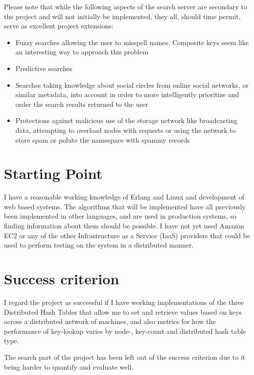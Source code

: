 Please note that while the following aspects of the search server are secondary to the project and will not initially be implemented, they all, should time permit, serve as excellent project extensions:

\begin{itemize}
  \item Fuzzy searches allowing the user to misspell names. Composite keys seem like an interesting way to approach this problem
  \item Predictive searches
  \item Searches taking knowledge about social circles from online social networks, or similar metadata, into account in order to more intelligently prioritize and order the search results returned to the user
  \item Protections against malicious use of the storage network like broadcasting data, attempting to overload nodes with requests or using the network to store spam or polute the namespace with spammy records
\end{itemize}


\section*{Starting Point}

I have a reasonable working knowledge of Erlang and Linux and development of web based systems. The algorithms that will be implemented have all previously been implemented in other languages, and are used in production systems, so finding information about them should be possible. I have not yet used Amazon EC2 or any of the other Infrastructure as a Service (IaaS) providers that could be used to perform testing on the system in a distributed manner.


\section*{Success criterion}

I regard the project as successful if I have working implementations of the three Distributed Hash Tables that allow me to set and retrieve values based on keys across a distributed network of machines, and also metrics for how the performance of key-lookup varies by node-, key-count and distributed hash table type.

The search part of the project has been left out of the success criterion due to it being harder to quantify and evaluate well.

